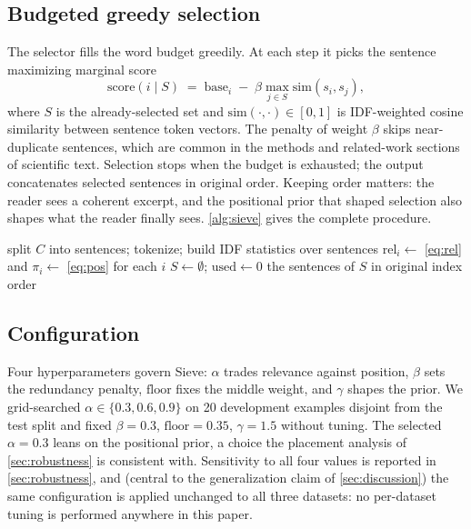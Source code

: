 \documentclass[review,12pt]{elsarticle}
\DeclarePairedDelimiter\abs{\lvert}{\rvert}
\theoremstyle{remark}
\newcommand{\method}{Sieve}
\begin{document}
\subsection{Budgeted greedy selection}
The selector fills the word budget greedily. At each step it picks the
sentence maximizing marginal score
\begin{equation}
\label{eq:mmr}
\mathrm{score}(i \mid S) \;=\; \mathrm{base}_i
\;-\; \beta \max_{j \in S} \mathrm{sim}(s_i, s_j),
\end{equation}
where $S$ is the already-selected set and
$\mathrm{sim}(\cdot,\cdot)\in[0,1]$ is IDF-weighted cosine similarity
between sentence token vectors. The penalty of weight $\beta$ skips
near-duplicate sentences, which are common in the methods and
related-work sections of scientific text. Selection stops when the
budget is exhausted; the output concatenates selected sentences in
original order. Keeping order matters: the reader sees a coherent
excerpt, and the positional prior that shaped selection also shapes
what the reader finally sees. \autoref{alg:sieve} gives the complete
procedure.

\begin{algorithm}[t]
\caption{\method{} selection}
\label{alg:sieve}
split $C$ into sentences; tokenize; build IDF statistics over
sentences\;
$\mathrm{rel}_i \leftarrow$ \eqref{eq:rel} and
$\pi_i \leftarrow$ \eqref{eq:pos} for each $i$\;
$S \leftarrow \emptyset$; $\mathrm{used} \leftarrow 0$\;
\Return the sentences of $S$ in original index order
\end{algorithm}

\subsection{Configuration}
Four hyperparameters govern \method{}: $\alpha$ trades relevance
against position, $\beta$ sets the redundancy penalty, $\mathrm{floor}$
fixes the middle weight, and $\gamma$ shapes the prior. We
grid-searched $\alpha \in \{0.3, 0.6, 0.9\}$ on 20 development
examples disjoint from the test split and fixed $\beta=0.3$,
$\mathrm{floor}=0.35$, $\gamma=1.5$ without tuning. The selected
$\alpha=0.3$ leans on the positional prior, a choice the placement
analysis of \autoref{sec:robustness} is consistent with. Sensitivity
to all four values is reported in \autoref{sec:robustness}, and
(central to the generalization claim of \autoref{sec:discussion}) the
same configuration is applied unchanged to all three datasets: no
per-dataset tuning is performed anywhere in this paper.
\end{document}

